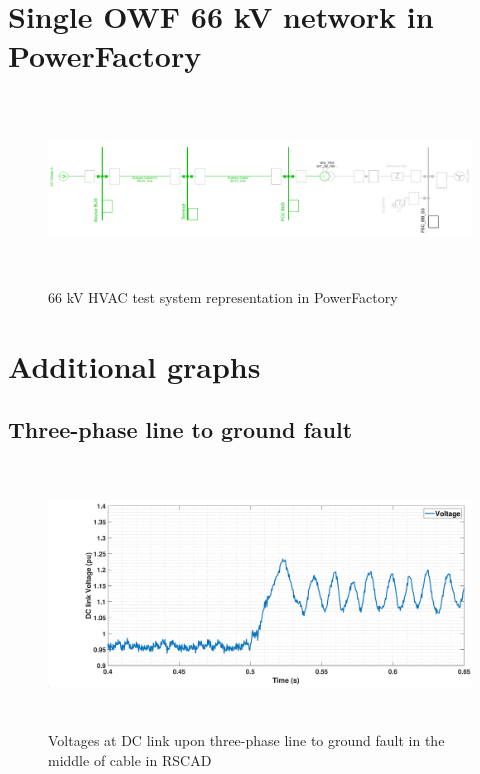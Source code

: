 \section{Single OWF 66 kV network in PowerFactory}
\begin{figure}[H]
\centering
    \includegraphics[height = 5cm,width = 17.5cm]{Diagrams/Appendix_B/WT1_AC_PFD_network_view.pdf}
    \caption{66 kV HVAC test system representation in PowerFactory}
    \label{fig:WT1_AC_PFD_network_view}
\end{figure}

\section{Additional graphs}
\subsection{Three-phase line to ground fault}

\begin{figure}[H]
    \includegraphics[height = 7cm,width = \textwidth]{Diagrams/Appendix_B/DC_Voltage_RSCAD.eps}
    \caption{Voltages at DC link upon three-phase line to ground fault in the middle of cable in RSCAD}
    \label{DC_Voltage_RSCAD}
\end{figure}

